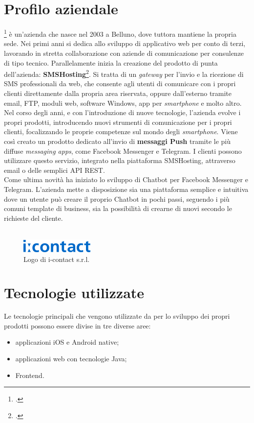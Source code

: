 \section{Profilo aziendale}
\azienda\footcite{icontact} è un'azienda che nasce nel 2003 a Belluno, dove tuttora mantiene la propria sede. Nei primi anni si dedica allo sviluppo di applicativo web per conto di terzi, lavorando in stretta collaborazione con aziende di comunicazione per consulenze di tipo tecnico. Parallelamente inizia la creazione del prodotto di punta dell'azienda: \textbf{SMSHosting}\footcite{smshosting}. Si tratta di un \emph{gateway} per l'invio e la ricezione di SMS professionali da web, che consente agli utenti di comunicare con i propri clienti direttamente dalla propria area riservata, oppure dall'esterno tramite email, \gls{FTP}, moduli web, software Windows, app per \emph{smartphone} e molto altro.  \\
Nel corso degli anni, e con l'introduzione di nuove tecnologie, l'azienda evolve i propri prodotti, introducendo nuovi strumenti di comunicazione per i propri clienti, focalizzando le proprie competenze sul mondo degli \emph{smartphone}.
Viene così creato un prodotto dedicato all'invio di \textbf{messaggi \gls{Push}} tramite le più diffuse \emph{messaging apps}, come Facebook Messenger e Telegram. I clienti possono utilizzare questo servizio, integrato nella piattaforma SMSHosting, attraverso email o delle semplici \gls{API} REST.\\
Come ultima novità \azienda{} ha iniziato lo sviluppo di \gls{Chatbot} per Facebook Messenger e Telegram. L'azienda mette a disposizione sia una piattaforma semplice e intuitiva dove un utente può creare il proprio \gls{Chatbot} in pochi passi, seguendo i più comuni template di business, sia la possibilità di crearne di nuovi secondo le richieste del cliente.
\\ \\
\begin{figure}[h]
	\centering
	\includegraphics[scale=1]{../Immagini/logo-icontact.png}
	\caption{Logo di i-contact s.r.l.}
\end{figure}

\section{Tecnologie utilizzate}
Le tecnologie principali che vengono utilizzate da \azienda{} per lo sviluppo dei propri prodotti possono essere divise in tre diverse aree:
\begin{itemize}
	\item applicazioni iOS e Android native;
	\item applicazioni web con tecnologie Java;
	\item \gls{Frontend}.
\end{itemize} 

